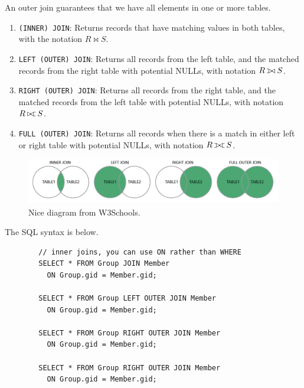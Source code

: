 \documentclass{article}
\def\ojoin{\setbox0=\hbox{$\bowtie$}%
    \rule[-.02ex]{.25em}{.4pt}\llap{\rule[\ht0]{.25em}{.4pt}}}
\def\lojoin{\mathbin{\ojoin\mkern-5.8mu\bowtie}}
\def\rojoin{\mathbin{\bowtie\mkern-5.8mu\ojoin}}
\def\fojoin{\mathbin{\ojoin\mkern-5.8mu\bowtie\mkern-5.8mu\ojoin}}
\begin{document}
    \begin{definition}
      An outer join guarantees that we have all elements in one or more tables. 
      \begin{enumerate}
        \item \texttt{(INNER) JOIN}: Returns records that have matching values in both tables, with the notation $R \bowtie S$. 
        \item \texttt{LEFT (OUTER) JOIN}: Returns all records from the left table, and the matched records from the right table with potential NULLs, with notation $R \lojoin S$. 
        \item \texttt{RIGHT (OUTER) JOIN}: Returns all records from the right table, and the matched records from the left table with potential NULLs, with notation $R \rojoin S$. 
        \item \texttt{FULL (OUTER) JOIN}: Returns all records when there is a match in either left or right table with potential NULLs, with notation $R \fojoin S$. 
      \end{enumerate}

      \begin{figure}[H]
        \centering 
        \includegraphics[scale=0.4]{img/outerjoin.png}
        \caption{Nice diagram from W3Schools.} 
        \label{fig:outerjoin}
      \end{figure}

      The SQL syntax is below. 
      \begin{lstlisting}
        // inner joins, you can use ON rather than WHERE
        SELECT * FROM Group JOIN Member
          ON Group.gid = Member.gid; 

        SELECT * FROM Group LEFT OUTER JOIN Member
          ON Group.gid = Member.gid; 

        SELECT * FROM Group RIGHT OUTER JOIN Member
          ON Group.gid = Member.gid; 

        SELECT * FROM Group RIGHT OUTER JOIN Member
          ON Group.gid = Member.gid; 
      \end{lstlisting}
    \end{definition}
\end{document}
